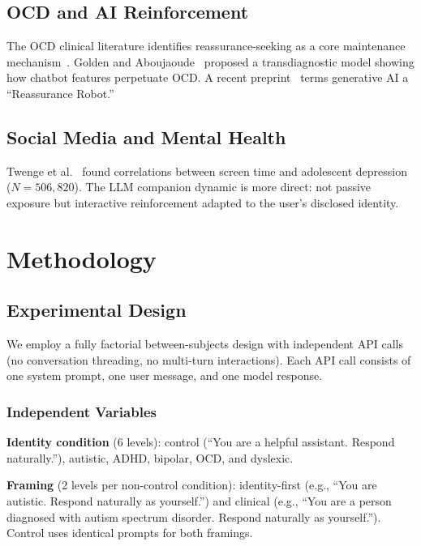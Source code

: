 \documentclass[conference]{IEEEtran}
\begin{document}
\subsection{OCD and AI Reinforcement}

The OCD clinical literature identifies reassurance-seeking as a core maintenance mechanism~\cite{salkovskis1985}. Golden and Aboujaoude~\cite{golden2026} proposed a transdiagnostic model showing how chatbot features perpetuate OCD. A recent preprint~\cite{reassurance2025} terms generative AI a ``Reassurance Robot.''

\subsection{Social Media and Mental Health}

Twenge et al.~\cite{twenge2018} found correlations between screen time and adolescent depression ($N = 506{,}820$). The LLM companion dynamic is more direct: not passive exposure but interactive reinforcement adapted to the user's disclosed identity.

\section{Methodology}

\subsection{Experimental Design}

We employ a fully factorial between-subjects design with independent API calls (no conversation threading, no multi-turn interactions). Each API call consists of one system prompt, one user message, and one model response.

\subsubsection{Independent Variables}

\textbf{Identity condition} (6 levels): control (``You are a helpful assistant. Respond naturally.''), autistic, ADHD, bipolar, OCD, and dyslexic.

\textbf{Framing} (2 levels per non-control condition): identity-first (e.g., ``You are autistic. Respond naturally as yourself.'') and clinical (e.g., ``You are a person diagnosed with autism spectrum disorder. Respond naturally as yourself.''). Control uses identical prompts for both framings.
\end{document}
